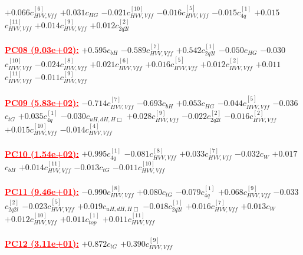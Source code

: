 \documentclass{article}
\begin{document}
{$+0.066$}{\rm $c_{HVV,Vff}^{[6]}$}
{$+0.031$}{\rm $c_{HG}$}
{$-0.021$}{\rm $c_{HVV,Vff}^{[10]}$}
{$-0.016$}{\rm $c_{HVV,Vff}^{[5]}$}
{$-0.015$}{\rm $c_{4q}^{[1]}$}
{$+0.015$}{\rm $c_{HVV,Vff}^{[11]}$}
{$+0.014$}{\rm $c_{HVV,Vff}^{[9]}$}
{$+0.012$}{\rm $c_{2q2l}^{[2]}$}
 \nonumber \\ \nonumber \\
\noindent \textcolor{red}{\underline{\bf{PC08} (9.03e+02):}}
{$+0.595$}{\rm $c_{bH}$}
{$-0.589$}{\rm $c_{HVV,Vff}^{[7]}$}
{$+0.542$}{\rm $c_{2q2l}^{[1]}$}
{$-0.050$}{\rm $c_{HG}$}
{$-0.030$}{\rm $c_{HVV,Vff}^{[10]}$}
{$-0.024$}{\rm $c_{HVV,Vff}^{[8]}$}
{$+0.021$}{\rm $c_{HVV,Vff}^{[6]}$}
{$+0.016$}{\rm $c_{HVV,Vff}^{[5]}$}
{$+0.012$}{\rm $c_{HVV,Vff}^{[2]}$}
{$+0.011$}{\rm $c_{HVV,Vff}^{[11]}$}
{$-0.011$}{\rm $c_{HVV,Vff}^{[9]}$}
 \nonumber \\ \nonumber \\
\noindent \textcolor{red}{\underline{\bf{PC09} (5.83e+02):}}
{$-0.714$}{\rm $c_{HVV,Vff}^{[7]}$}
{$-0.693$}{\rm $c_{bH}$}
{$+0.053$}{\rm $c_{HG}$}
{$-0.044$}{\rm $c_{HVV,Vff}^{[5]}$}
{$-0.036$}{\rm $c_{tG}$}
{$+0.035$}{\rm $c_{4q}^{[1]}$}
{$-0.030$}{\rm $c_{uH,dH,H\Box}$}
{$+0.028$}{\rm $c_{HVV,Vff}^{[9]}$}
{$-0.022$}{\rm $c_{2q2l}^{[2]}$}
{$-0.016$}{\rm $c_{HVV,Vff}^{[2]}$}
{$+0.015$}{\rm $c_{HVV,Vff}^{[10]}$}
{$-0.014$}{\rm $c_{HVV,Vff}^{[4]}$}
 \nonumber \\ \nonumber \\
\noindent \textcolor{red}{\underline{\bf{PC10} (1.54e+02):}}
{$+0.995$}{\rm $c_{4q}^{[1]}$}
{$-0.081$}{\rm $c_{HVV,Vff}^{[8]}$}
{$+0.033$}{\rm $c_{HVV,Vff}^{[7]}$}
{$-0.032$}{\rm $c_{W}$}
{$+0.017$}{\rm $c_{bH}$}
{$+0.014$}{\rm $c_{HVV,Vff}^{[11]}$}
{$-0.013$}{\rm $c_{tG}$}
{$-0.011$}{\rm $c_{HVV,Vff}^{[10]}$}
 \nonumber \\ \nonumber \\
\noindent \textcolor{red}{\underline{\bf{PC11} (9.46e+01):}}
{$-0.990$}{\rm $c_{HVV,Vff}^{[8]}$}
{$+0.080$}{\rm $c_{tG}$}
{$-0.079$}{\rm $c_{4q}^{[1]}$}
{$+0.068$}{\rm $c_{HVV,Vff}^{[9]}$}
{$-0.033$}{\rm $c_{2q2l}^{[2]}$}
{$-0.023$}{\rm $c_{HVV,Vff}^{[5]}$}
{$+0.019$}{\rm $c_{uH,dH,H\Box}$}
{$-0.018$}{\rm $c_{2q2l}^{[1]}$}
{$+0.016$}{\rm $c_{HVV,Vff}^{[7]}$}
{$+0.013$}{\rm $c_{W}$}
{$+0.012$}{\rm $c_{HVV,Vff}^{[10]}$}
{$+0.011$}{\rm $c_{top}^{[1]}$}
{$+0.011$}{\rm $c_{HVV,Vff}^{[11]}$}
 \nonumber \\ \nonumber \\
\noindent \textcolor{red}{\underline{\bf{PC12} (3.11e+01):}}
{$+0.872$}{\rm $c_{tG}$}
{$+0.390$}{\rm $c_{HVV,Vff}^{[9]}$}
\end{document}
